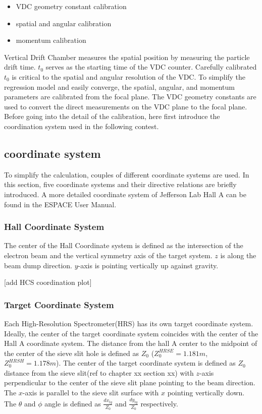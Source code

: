 \begin{itemize}
    \item VDC geometry constant calibration 
    \item spatial and angular calibration
    \item momentum calibration
\end{itemize}

Vertical Drift Chamber measures the spatial position by measuring the particle drift time. $t_0$ serves as the starting time of the VDC counter. Carefully calibrated $t_0$ is critical to the spatial and angular resolution of the VDC. To simplify the regression model and easily converge, the spatial, angular, and momentum parameters are calibrated from the focal plane. The VDC geometry constants are used to convert the direct measurements on the VDC plane to the focal plane. Before going into the detail of the calibration, here first introduce the coordination system used in the following contest. 

\subsection{coordinate system}


To simplify the calculation, couples of different coordinate systems are used. In this section, five coordinate systems and their directive relations are briefly introduced. A more detailed coordinate system of Jefferson Lab Hall A can be found in the ESPACE User Manual\cite{espace2002manual}.  

\subsubsection{Hall Coordinate System}
The center of the Hall Coordinate system is defined as the intersection of the electron beam and the vertical symmetry axis of the target system. $z$ is along the beam dump direction. $y$-axis is pointing vertically up against gravity.

[add HCS coordination plot]

\subsubsection{Target Coordinate System}

Each High-Resolution Spectrometer(HRS) has its own target coordinate system. Ideally, the center of the target coordinate system coincides with the center of the Hall A coordinate system. The distance from the hall A center to the midpoint of the center of the sieve slit hole is defined as $Z_0$ ($Z^{HRSE}_0 = 1.181 m$, $Z^{HRSH}_0 = 1.178 m$). The center of the target coordinate system is defined as $Z_0$ distance from the sieve slit(ref to chapter xx section xx) with $z$-axis perpendicular to the center of the sieve slit plane pointing to the beam direction. The $x$-axis is parallel to the sieve slit surface with $x$ pointing vertically down. The $\theta$ and $\phi$ angle is defined as $\frac{dx_{tg}}{Z_0}$ and $\frac{dy_{tg}}{Z_0}$ respectively.

